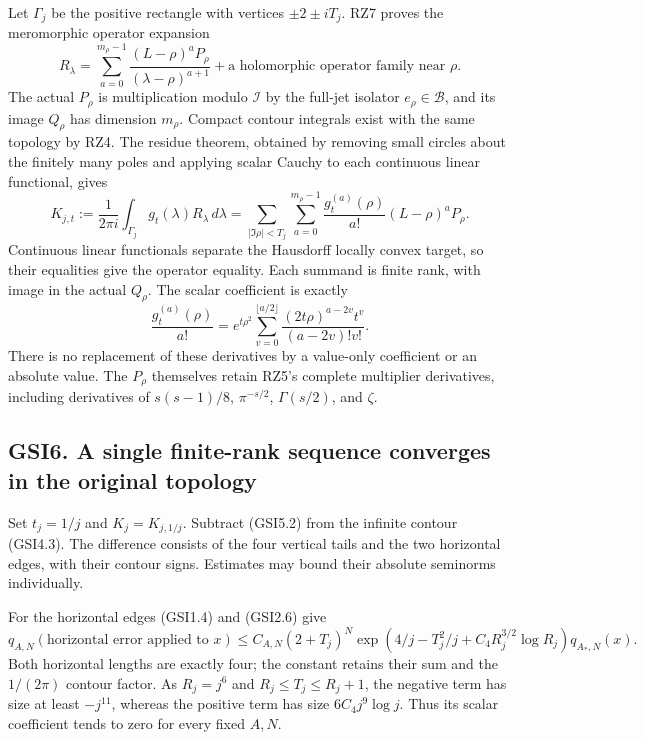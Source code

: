 Let \(\Gamma_j\) be the positive rectangle with vertices
\(\pm2\pm iT_j\). RZ7 proves the meromorphic operator expansion \[
R_\lambda=\sum_{a=0}^{m_\rho-1}
\frac{(L-\rho)^aP_\rho}{(\lambda-\rho)^{a+1}}
+\text{a holomorphic operator family near }\rho.
\tag{GSI5.1}
\] The actual \(P_\rho\) is multiplication modulo \(\mathcal I\) by the
full-jet isolator \(e_\rho\in\mathcal B\), and its image \(Q_\rho\) has
dimension \(m_\rho\). Compact contour integrals exist with the same
topology by RZ4. The residue theorem, obtained by removing small circles
about the finitely many poles and applying scalar Cauchy to each
continuous linear functional, gives \[
K_{j,t}:=\frac1{2\pi i}\int_{\Gamma_j}g_t(\lambda)R_\lambda\,d\lambda
=\sum_{|\Im\rho|<T_j}\sum_{a=0}^{m_\rho-1}
\frac{g_t^{(a)}(\rho)}{a!}(L-\rho)^aP_\rho.
\tag{GSI5.2}
\] Continuous linear functionals separate the Hausdorff locally convex
target, so their equalities give the operator equality. Each summand is
finite rank, with image in the actual \(Q_\rho\). The scalar coefficient
is exactly \[
\frac{g_t^{(a)}(\rho)}{a!}
=e^{t\rho^2}\sum_{v=0}^{\lfloor a/2\rfloor}
\frac{(2t\rho)^{a-2v}t^v}{(a-2v)!v!}.
\tag{GSI5.3}
\] There is no replacement of these derivatives by a value-only
coefficient or an absolute value. The \(P_\rho\) themselves retain RZ5's
complete multiplier derivatives, including derivatives of \(s(s-1)/8\),
\(\pi^{-s/2}\), \(\Gamma(s/2)\), and \(\zeta\).

\subsection{GSI6. A single finite-rank sequence converges in the
original
topology}\label{gsi6.-a-single-finite-rank-sequence-converges-in-the-original-topology}

Set \(t_j=1/j\) and \(K_j=K_{j,1/j}\). Subtract (GSI5.2) from the
infinite contour (GSI4.3). The difference consists of the four vertical
tails and the two horizontal edges, with their contour signs. Estimates
may bound their absolute seminorms individually.

For the horizontal edges (GSI1.4) and (GSI2.6) give \[
q_{A,N}(\text{horizontal error applied to }x)
\le C_{A,N}(2+T_j)^N
\exp\left(4/j-T_j^2/j+C_4R_j^{3/2}\log R_j\right)
q_{A_*,N}(x).
\tag{GSI6.1}
\] Both horizontal lengths are exactly four; the constant retains their
sum and the \(1/(2\pi)\) contour factor. As \(R_j=j^6\) and
\(R_j\le T_j\le R_j+1\), the negative term has size at least
\(-j^{11}\), whereas the positive term has size \(6C_4j^9\log j\). Thus
its scalar coefficient tends to zero for every fixed \(A,N\).

